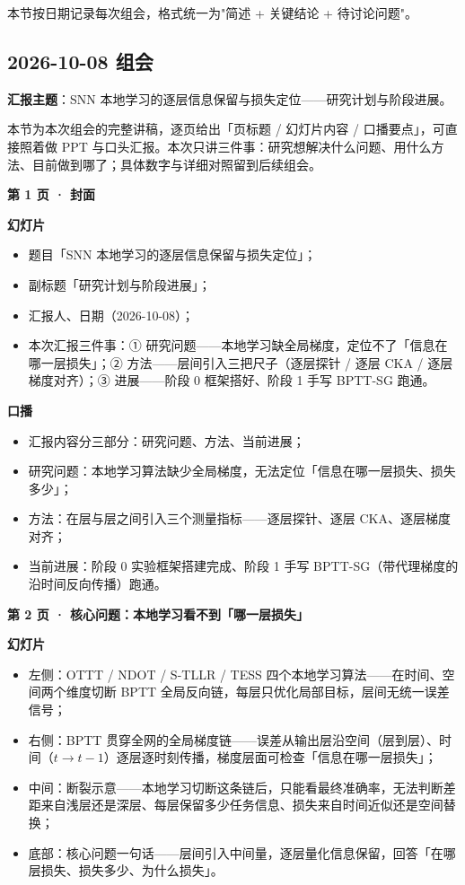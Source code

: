 \documentclass[journal,12pt,onecolumn]{IEEEtran}
\begin{document}
本节按日期记录每次组会，格式统一为"简述 + 关键结论 + 待讨论问题"。

\subsection{2026-10-08 组会}

\textbf{汇报主题}：SNN 本地学习的逐层信息保留与损失定位——研究计划与阶段进展。

本节为本次组会的完整讲稿，逐页给出「页标题 / 幻灯片内容 / 口播要点」，可直接照着做 PPT 与口头汇报。本次只讲三件事：研究想解决什么问题、用什么方法、目前做到哪了；具体数字与详细对照留到后续组会。

\textbf{第 1 页 · 封面}

\textbf{幻灯片}
\begin{itemize}[leftmargin=1.5em,itemsep=0pt]
\item 题目「SNN 本地学习的逐层信息保留与损失定位」；
\item 副标题「研究计划与阶段进展」；
\item 汇报人、日期（2026-10-08）；
\item 本次汇报三件事：① 研究问题——本地学习缺全局梯度，定位不了「信息在哪一层损失」；② 方法——层间引入三把尺子（逐层探针 / 逐层 CKA / 逐层梯度对齐）；③ 进展——阶段 0 框架搭好、阶段 1 手写 BPTT-SG 跑通。
\end{itemize}

\textbf{口播}
\begin{itemize}[leftmargin=1.5em,itemsep=0pt]
\item 汇报内容分三部分：研究问题、方法、当前进展；
\item 研究问题：本地学习算法缺少全局梯度，无法定位「信息在哪一层损失、损失多少」；
\item 方法：在层与层之间引入三个测量指标——逐层探针、逐层 CKA、逐层梯度对齐；
\item 当前进展：阶段 0 实验框架搭建完成、阶段 1 手写 BPTT-SG（带代理梯度的沿时间反向传播）跑通。
\end{itemize}

\textbf{第 2 页 · 核心问题：本地学习看不到「哪一层损失」}

\textbf{幻灯片}
\begin{itemize}[leftmargin=1.5em,itemsep=0pt]
\item 左侧：OTTT / NDOT / S-TLLR / TESS 四个本地学习算法——在时间、空间两个维度切断 BPTT 全局反向链，每层只优化局部目标，层间无统一误差信号；
\item 右侧：BPTT 贯穿全网的全局梯度链——误差从输出层沿空间（层到层）、时间（$t\to t-1$）逐层逐时刻传播，梯度层面可检查「信息在哪一层损失」；
\item 中间：断裂示意——本地学习切断这条链后，只能看最终准确率，无法判断差距来自浅层还是深层、每层保留多少任务信息、损失来自时间近似还是空间替换；
\item 底部：核心问题一句话——层间引入中间量，逐层量化信息保留，回答「在哪层损失、损失多少、为什么损失」。
\end{itemize}
\end{document}
